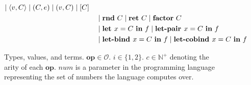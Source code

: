 \begin{figure}[tbp]
\begin{alignat*}{3}
         \mid \langle v, C \rangle
         \mid (C, e)
         \mid (v, C)
         \mid [ C ] \\
         & & &
         \mid \mathbf{rnd}~C 
         \mid \mathbf{ret}~C 
         \mid \mathbf{factor}~C \\ 
         & & &
         \mid \textbf{let } x = C \ \textbf{in} \ f
         \mid \textbf{let-pair } x = C \ \textbf{in} \ f \\
         & & &
         \mid \textbf{let-bind } x = C \ \textbf{in} \ f
         \mid \textbf{let-cobind } x = C \ \textbf{in} \ f \\
  \end{alignat*}
  \caption{
    Types, values, and terms. $\mathbf{op} \in \mathcal{O}$. $i \in \{1, 2\}$.
    $c \in \mathbb{N}^{+}$ denoting the arity of each $\textbf{op}$.
    $\textit{num}$ is a parameter in the programming language representing the
    set of numbers the language computes over.
  }
  \label{fig:syntax}
\end{figure}
